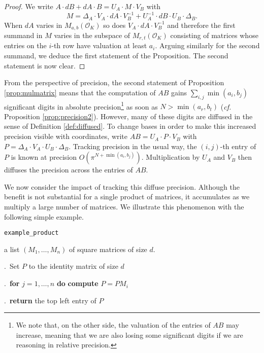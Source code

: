 \documentclass{sig-alternate-2013}
\renewcommand{\O}{\mathcal O}
\begin{document}
\begin{proof}
We write $A \cdot dB + dA \cdot B = U_A \cdot M \cdot V_B$ with
$$M = \Delta_A \cdot V_A \cdot dA \cdot V_B^{-1} 
+ U_A^{-1} \cdot dB \cdot U_B \cdot \Delta_B.$$
When $dA$ varies in $M_{a,b}(\O_K)$ so does $V_A \cdot dA \cdot V_B^{-1}$
and therefore the first summand in $M$ varies in the subspace of 
$M_{r,t}(\O_K)$ consisting of matrices whose entries on the $i$-th
row have valuation at least $a_i$. Arguing similarly for the second
summand, we deduce the first statement of the Proposition. The second
statement is now clear.
\end{proof}

From the perspective of precision, the second statement of Proposition 
\ref{prop:mulmatrix} means that the computation of $AB$ gains 
$\sum_{i,j} \min(a_i,b_j)$ significant digits in absolute 
precision\footnote{We
note that, on the other side, the valuation of the entries of $AB$ may 
increase, meaning that we are also losing some significant digits if we 
are reasoning in relative precision.} as soon as $N > \min(a_r, b_t)$ 
(\emph{cf.} Proposition \ref{prop:precision2}). However, many of these digits are 
diffused in the sense of Definition \ref{def:diffused}.
To change bases in order to make this increased precision visible
with coordinates, write 
$AB = U_A \cdot P \cdot V_B$ with
$P = \Delta_A \cdot V_A \cdot U_B \cdot \Delta_B$.
Tracking precision in the usual way, the $(i,j)$-th entry
of $P$ is known at precision $O(\pi^{N + \min(a_i,b_j)})$.  Multiplication by
$U_A$ and $V_B$ then diffuses the precision across the entries of $AB$.

\smallskip

We now consider the impact of tracking this diffuse precision.
Although the benefit is not substantial for
a single product of matrices, it accumulates as we multiply a large
number of matrices.  We illustrate this phenomenon with the following simple
example.

\noindent\hrulefill

 {\tt example\_product}

 a list $(M_1, \ldots, M_n)$ of square matrices
of size $d$.

\smallskip

.\ Set $P$ to the identity matrix of size $d$

.\ {\bf for} $j=1,\dots,n$ {\bf do} {\bf compute} $P = P M_i$

.\ {\bf return} the top left entry of $P$
\end{document}
